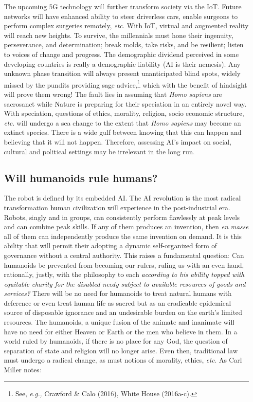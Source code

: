 \begin{multicols}{2}
The upcoming 5G technology will further transform society via the IoT. Future networks will have enhanced ability to steer driverless cars, enable surgeons to perform complex surgeries remotely, \textit{etc.} With IoT, virtual and augmented reality will reach new heights. To survive, the millennials must hone their ingenuity, perseverance, and determination; break molds, take risks, and be resilient; listen to voices of change and progress. The demographic dividend perceived in some developing countries is really a demographic liability (AI is their nemesis). Any unknown phase transition will always present unanticipated blind spots, widely missed by the pundits providing sage advice,\footnote{See, \textit{e.g.,} Crawford \& Calo (2016), White House (2016a-c).}  which with the benefit of hindsight will prove them wrong! The fault lies in assuming that \textit{Homo sapiens} are sacrosanct while Nature is preparing for their speciation in an entirely novel way. With speciation, questions of ethics, morality, religion, socio economic structure, \textit{etc}. will undergo a sea change to the extent that \textit{Homo sapiens} may become an extinct species. There is a wide gulf between knowing that this can happen and believing that it will not happen. Therefore, assessing AI's impact on social, cultural and political settings may be irrelevant in the long run.

\subsection*{Will humanoids rule humans?}

The robot is defined by its embedded AI. The AI revolution is the most radical transformation human civilization will experience in the post-industrial era. Robots, singly and in groups, can consistently perform flawlessly at peak levels and can combine peak skills. If any of them produces an invention, then \textit{en masse} all of them can independently produce the same invention on demand. It is this ability that will permit their adopting a dynamic self-organized form of governance without a central authority. This raises a fundamental question: Can humanoids be prevented from becoming our rulers, ruling us with an even hand, rationally, justly, with the philosophy to each \textit{according to his ability topped with equitable charity for the disabled needy subject to available resources of goods and services?} There will be no need for humanoids to treat natural humans with deference or even treat human life as sacred but as an eradicable epidemical source of disposable ignorance and an undesirable burden on the earth's limited resources. The humanoids, a unique fusion of the animate and inanimate will have no need for either Heaven or Earth or the men who believe in them. In a world ruled by humanoids, if there is no place for any God, the question of separation of state and religion will no longer arise. Even then, traditional law must undergo a radical change, as must notions of morality, ethics, \textit{etc.} As Carl Miller notes:


\end{multicols}
